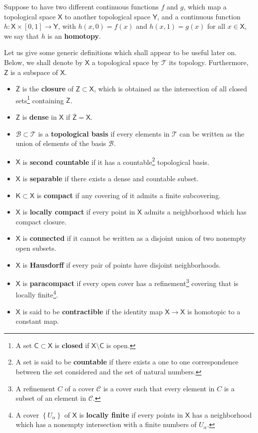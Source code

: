 \documentclass[11pt]{book}
\newcommand{\Bcal}{\mathcal{B}}
\newcommand{\Ccal}{\mathcal{C}}
\newcommand{\Tcal}{\mathcal{T}}
\newcommand{\Csf}{\mathsf{C}}
\newcommand{\Ksf}{\mathsf{K}}
\newcommand{\Xsf}{\mathsf{X}}
\newcommand{\Ysf}{\mathsf{Y}}
\newcommand{\Zsf}{\mathsf{Z}}
\theoremstyle{break}
\begin{document}
\bigskip


Suppose to have two different continuous functions $f$ and $g$, which map a topological space $\Xsf$ to another topological space $\Ysf$, and a continuous function $h : \Xsf \times [0,1] \to \Ysf$, with  $h(x,0) = f(x)$ and $h(x,1) = g(x)$ for all $x \in \Xsf$, we say that $h$ is an \textbf{homotopy}. 

\bigskip


Let us give some generic definitions which shall appear to be useful later on. Below, we shall denote by $\Xsf$ a topological space by $\Tcal$ its topology. Furthermore, $\Zsf$ is a subspace of $\Xsf$.


\begin{itemize}
%
\item $\overline{\Zsf}$ is the \textbf{closure} of $\Zsf \subset \Xsf$, which is obtained as the intersection of all closed sets\footnote{A set $\Csf \subset \Xsf$ is \textbf{closed} if $\Xsf \setminus \Csf$ is open.} containing $\Zsf$.%
%
\item $\Zsf$ is \textbf{dense} in $\Xsf$ if $\overline{\Zsf} = \Xsf$.%
%
\item $\Bcal \subset \Tcal$ is a \textbf{topological basis} if every elements in $\Tcal$ can be written as the union of elements of the basis $\Bcal$.%
%
\item $\Xsf$ is \textbf{second countable} if it has a countable\footnote{A set is said to be \textbf{countable} if there exists a one to one correspondence between the set considered and the set of natural numbers.} topological basis.%
%
\item $\Xsf$ is \textbf{separable} if there exists a dense and countable subset.%
%
\item $\Ksf \subset \Xsf$ is \textbf{compact} if any covering of it admits a finite subcovering.%
%
\item $\Xsf$ is \textbf{locally compact} if every point in $\Xsf$ admits a neighborhood which has compact closure.%
%
\item $\Xsf$ is \textbf{connected} if it cannot be written as a disjoint union of two nonempty open subsets.%
%
\item $\Xsf$ is \textbf{Hausdorff} if every pair of points have disjoint neighborhoods.%
%
\item $\Xsf$ is \textbf{paracompact} if every open cover has a refinement\footnote{A refinement $C$ of a cover $\Ccal$ is a cover such that every element in $C$ is a subset of an element in $\Ccal$.} covering that is locally finite\footnote{A cover $\left\{U_\alpha\right\}$ of $\Xsf$ is \textbf{locally finite} if every points in $\Xsf$ has a neighborhood which has a nonempty intersection with a finite numbers of $U_\alpha$.}.%
%
\item $\Xsf$ is said to be \textbf{contractible} if the identity map $\Xsf \to \Xsf$ is homotopic to a constant map.
\end{itemize}
\end{document}
